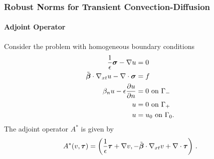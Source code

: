 \documentclass[18pt,xcolor=table]{beamer}
\begin{document}
\begin{frame}[t]
\frametitle{Robust Norms for Transient Convection-Diffusion}
\framesubtitle{Adjoint Operator}
Consider the problem with homogeneous boundary conditions
\begin{align*}
\frac{1}{\epsilon}\boldsymbol\sigma-\nabla u &=0\\
\tilde{\boldsymbol\beta}\cdot\nabla_{xt} u - \nabla\cdot\boldsymbol\sigma &= f\\
\beta_n u-\epsilon\frac{\partial u}{\partial n} &= 0 \text{ on } \Gamma_-\\
u &= 0 \text{ on } \Gamma_+\\
u &= u_0 \text{ on } \Gamma_0.
\end{align*}
The adjoint operator $A^*$ is given by 
\[
A^*(v,\boldsymbol\tau)=\left( \frac{1}{\epsilon}\boldsymbol\tau+\nabla v,-\tilde{\boldsymbol\beta}\cdot\nabla_{xt} v+\nabla\cdot\boldsymbol\tau \right)\,.
\]
\end{frame}
\end{document}
